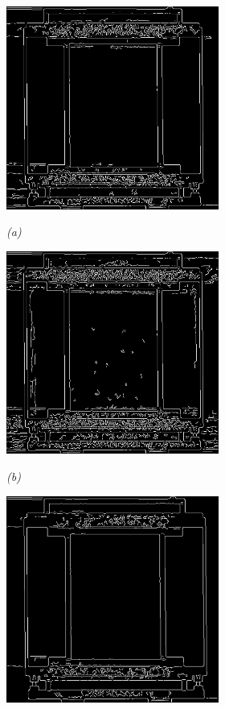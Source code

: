 \begin{figure}[htb]
  \begin{minipage}[b]{2.75in}
    \centering
    \centerline{\mbox{\includegraphics[width=2.75in]{data_extraction/images/canny/default/20121017_270.eps}}}
    \centerline{\emph{(a)}}
  \end{minipage}\medskip
  \begin{minipage}[b]{2.75in}
    \centering
    \centerline{\mbox{\includegraphics[width=2.75in]{data_extraction/images/canny/0.01_0.02/20121017_270.eps}}}
    \centerline{\emph{(b)}}
  \end{minipage}
  \begin{minipage}[b]{2.75in}
    \centering
    \centerline{\mbox{\includegraphics[width=2.75in]{data_extraction/images/canny/0.02_0.04/20121017_270.eps}}}

\end{minipage}
\end{figure}
